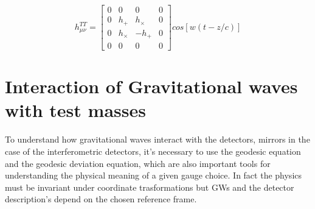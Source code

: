 \documentclass[binding=0.6cm, LaM]{sapthesis}
\begin{document}
\begin{equation} 
h_{\mu\nu}^{TT} = 
\begin{bmatrix}
0 & 0 & 0 & 0 \\
0 & h_{+} & h_{\times} & 0 \\
0 & h_{\times} & -h_{+} & 0 \\
0 & 0 & 0 & 0 
\end{bmatrix}cos[w(t-z/c)]
\end{equation}
\chapter{Interaction of Gravitational waves with test masses}
To understand how gravitational waves interact with the detectors, mirrors in the case of the interferometric detectors, it's necessary to use the geodesic equation and the geodesic deviation equation, which are also important tools for understanding the physical meaning of a given gauge choice. In fact the physics must be invariant under coordinate trasformations but GWs and the detector description's depend on the chosen reference frame. 
\end{document}

